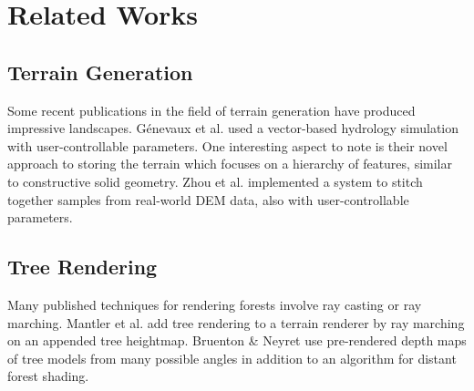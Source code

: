 
\iffalse  \fi

\chapter{Related Works} \label{rworks}

\section{Terrain Generation}

Some recent publications in the field of terrain generation have produced impressive landscapes.
G{\'e}nevaux et al. used a vector-based hydrology simulation with user-controllable parameters. \cite{hydrology}
One interesting aspect to note is their novel approach to storing the terrain which focuses on a hierarchy of features, similar to constructive solid geometry.
Zhou et al. implemented a system to stitch together samples from real-world DEM data, also with user-controllable parameters. \cite{DEMsynthesis}

\section{Tree Rendering}

Many published techniques for rendering forests involve ray casting or ray marching.
Mantler et al. add tree rendering to a terrain renderer by ray marching on an appended tree heightmap. \cite{terraintreecast}
Bruenton \& Neyret use pre-rendered depth maps of tree models from many possible angles in addition to an algorithm for distant forest shading. \cite{bruneton_trees}












